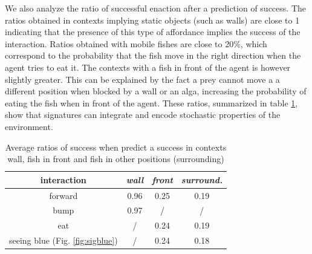 \documentclass[conference]{IEEEtran}
\begin{document}
We also analyze the ratio of successful enaction after a prediction of success. The ratios obtained in contexts implying static objects (such as walls) are close to 1 indicating that the presence of this type of affordance implies the success of the interaction. Ratios obtained with mobile fishes are close to 20\%, which correspond to the probability that the fish move in the right direction when the agent tries to eat it. The contexts with a fish in front of the agent is however slightly greater. This can be explained by the fact a prey cannot move a a different position when blocked by a wall or an alga, increasing the probability of eating the fish when in front of the agent. These ratios, summarized in table \ref{tab1}, show that signatures can integrate and encode stochastic properties of the environment.



\begin{table}[htbp]
\caption{Average ratios of success when predict a success in contexts wall, fish in front and fish in other positions (surrounding)}
\begin{center}
\begin{tabular}{|c|c|c|c|}
\hline
\textbf{interaction} & \textbf{\textit{wall}}& \textbf{\textit{front}} & \textbf{\textit{surround.}}\\
\hline
forward & 0.96 & 0.25 & 0.19 \\
\hline
bump    & 0.97 & /    &  / \\
\hline
eat & / & 0.24 & 0.19 \\
\hline
seeing blue (Fig. \ref{fig:sigblue}) & / & 0.24 & 0.18 \\
\hline
\end{tabular}
\label{tab1}
\end{center}
\end{table}
\end{document}

